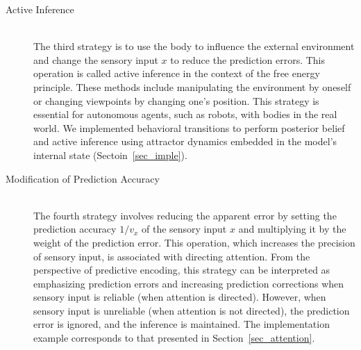 \begin{description}
\item[Active Inference]\mbox{}\\
The third strategy is to use the body to influence the external environment and change the sensory input $x$ to reduce the prediction errors. This operation is called active inference in the context of the free energy principle. These methods include manipulating the environment by oneself or changing viewpoints by changing one's position. This strategy is essential for autonomous agents, such as robots, with bodies in the real world. We implemented behavioral transitions to perform posterior belief and active inference using attractor dynamics embedded in the model's internal state (Sectoin~\ref{sec_imple}).


\item[Modification of Prediction Accuracy]\mbox{}\\
The fourth strategy involves reducing the apparent error by setting the prediction accuracy $1/v_x$ of the sensory input $x$ and multiplying it by the weight of the prediction error. This operation, which increases the precision of sensory input, is associated with directing attention. From the perspective of predictive encoding, this strategy can be interpreted as emphasizing prediction errors and increasing prediction corrections when sensory input is reliable (when attention is directed). However, when sensory input is unreliable (when attention is not directed), the prediction error is ignored, and the inference is maintained. The implementation example corresponds to that presented in Section~\ref{sec_attention}.
\end{description}


